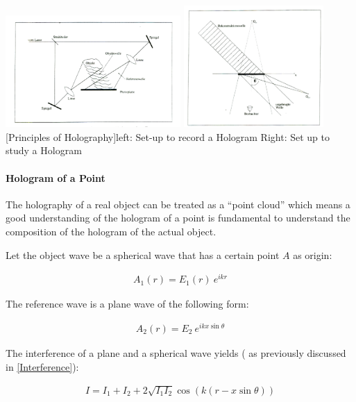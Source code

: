 \begin{minipage}{\textwidth}
	\centering
	\includegraphics[width=0.5\textwidth]{../figures/holo1}
	\includegraphics[width=0.4\textwidth]{../figures/holo2}
	[Principles of Holography]{left: Set-up to record a Hologram Right: Set up to study a Hologram }
\end{minipage}\vskip 0.5cm



\paragraph{Hologram of a Point}

The holography of a real object can be treated as a ``point cloud'' which means a good understanding of the hologram of a point is fundamental to understand the composition of the hologram of the actual object. 

Let the object wave be a spherical wave that has a certain point $A$ as origin:


\begin{align}
A_1(r)=E_1(r) \ e^{ikr}
\end{align}


The reference wave is a plane wave of the following form:

\begin{align}
A_2(r)=E_2\ e^{ikx \sin\theta} 
\end{align}


The interference of a plane and a spherical wave yields ( as previously discussed in \ref{Interference}):

\begin{align}
I=I_1+I_2+2\sqrt{I_1I_2}\cos(k(r-x\sin\theta))
\end{align}



